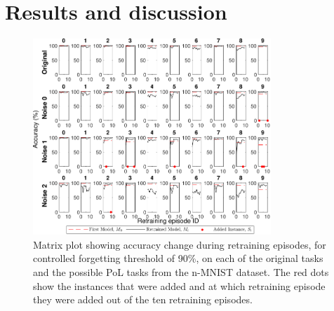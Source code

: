 \section{Results and discussion}
\begin{figure}[!t]
    \centering
        \includegraphics[width=0.8\textwidth]{other/figures/90-117-3_v4.pdf}
    \caption{Matrix plot showing accuracy change during retraining episodes, for controlled forgetting threshold of 90\%, on each of the original tasks and the possible PoL tasks from the n-MNIST dataset. The red dots show the instances that were added and at which retraining episode they were added out of the ten retraining episodes.}
    \label{Matrix_plot}
\end{figure}
